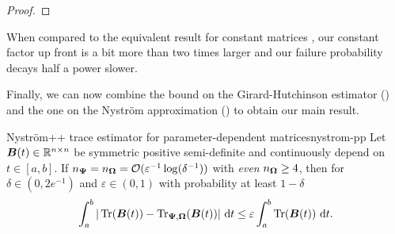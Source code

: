\begin{proof}
\end{proof}

\color{black}


When compared to the equivalent result for constant matrices \cite[Lemma 3.2]{persson-2022-improved-variants}, our constant factor up front is a bit more than two times larger and our failure probability decays half a power slower.
 
Finally, we can now combine the bound on the Girard-Hutchinson estimator () and the one on the Nyström approximation () to obtain our main result.

\begin{theorem}{Nyström++ trace estimator for parameter-dependent matrices}{nystrom-pp}
    Let $\boldsymbol{B}(t) \in \mathbb{R}^{n \times n}$ be symmetric positive semi-definite and continuously depend on $t \in [a, b]$. If $n_{\boldsymbol{\Psi}} = n_{\boldsymbol{\Omega}} = \mathcal{O}(\varepsilon^{-1} \log(\delta^{-1}))$ with \emph{even} $n_{\boldsymbol{\Omega}} \geq 4$, then for $\delta \in (0, 2e^{-1})$ and $\varepsilon \in (0, 1)$ with probability at least $1 - \delta$ 
    \begin{equation}
        \int_{a}^{b} | \operatorname{Tr}(\boldsymbol{B}(t)) - \operatorname{Tr}_{\boldsymbol{\Psi}, \boldsymbol{\Omega}}(\boldsymbol{B}(t)) |~\mathrm{d}t
        \leq \varepsilon \int_{a}^{b} \operatorname{Tr}(\boldsymbol{B}(t))~\mathrm{d}t.
    \end{equation}
\end{theorem}

